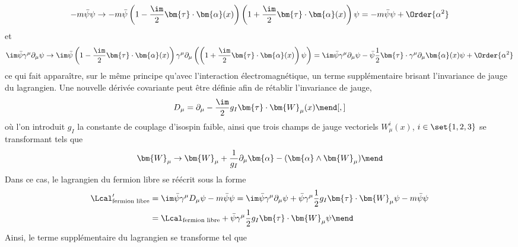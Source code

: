 \begin{equation}
-m\bar{\psi}\psi
\to
-m\bar{\psi}\left(1-\frac{\im}{2}\bm{\tau}\cdot\bm{\alpha}(x)\right)\left(1+\frac{\im}{2}\bm{\tau}\cdot\bm{\alpha}(x)\right)\psi
=-m\bar{\psi}\psi+\Order{\alpha^2}
\end{equation}
et
\begin{equation}
\im\bar{\psi} \gamma^\mu\partial_\mu \psi
\to
\im \bar{\psi}\left(1-\frac{\im}{2}\bm{\tau}\cdot\bm{\alpha}(x)\right)\gamma^\mu\partial_\mu \left(\left(1+\frac{\im}{2}\bm{\tau}\cdot\bm{\alpha}(x)\right)\psi\right)
=
\im \bar{\psi}\gamma^\mu\partial_\mu \psi
-
\bar{\psi}\frac{1}{2}\bm{\tau}\cdot\gamma^\mu\partial_\mu\bm{\alpha}(x) \psi+\Order{\alpha^2}
\label{eq-chapter-MS-MSSM-section-formalisme-subsec-EW-tr_jauge-terme_cinetique}
\end{equation}
ce qui fait apparaître, sur le même principe qu'avec l'interaction électromagnétique, un terme supplémentaire brisant l'invariance de jauge du lagrangien.
Une nouvelle dérivée covariante peut être définie afin de rétablir l'invariance de jauge,
\begin{equation}
D_\mu  = \partial_\mu  - \frac{\im}{2} g_I \bm{\tau}\cdot\bm{W}_\mu(x)
\mend[,]
\end{equation}
où l'on introduit $g_I$ la constante de couplage d'isospin faible, ainsi que trois champs de jauge vectoriels $W^i_\mu(x)$, $i\in\set{1,2,3}$ se transformant tels que
\begin{equation}
\bm{W}_\mu \to \bm{W}_\mu + \frac{1}{g_I}\partial_\mu\bm{\alpha} - (\bm{\alpha}\wedge\bm{W}_\mu)
\mend
\end{equation}
Dans ce cas, le lagrangien du fermion libre se réécrit sous la forme
\begin{align}
\Lcal_{\text{fermion libre}}'
&
= \im \bar{\psi} \gamma^\mu D_\mu \psi - m \bar{\psi}\psi
= \im \bar{\psi} \gamma^\mu \partial_\mu \psi + \bar{\psi} \gamma^\mu \frac{1}{2} g_I \bm{\tau}\cdot\bm{W}_\mu \psi - m \bar{\psi}\psi
\nonumber
\\&
=
\Lcal_{\text{fermion libre}}
+
\bar{\psi} \gamma^\mu \frac{1}{2} g_I \bm{\tau}\cdot\bm{W}_\mu \psi
\mend
\end{align}
Ainsi, le terme supplémentaire du lagrangien se transforme tel que

